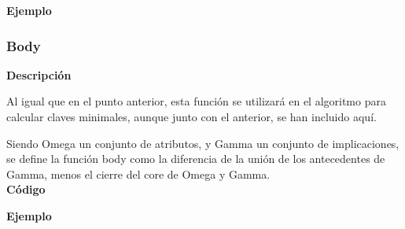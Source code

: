     \textbf{Ejemplo}




\subsubsection{Body}

    \textbf{Descripci\'on}

    Al igual que en el punto anterior, esta funci\'on se utilizar\'a en el algoritmo para calcular claves minimales, aunque junto con 
    el anterior, se han incluido aqu\'i.

    Siendo Omega un conjunto de atributos, y Gamma un conjunto de implicaciones, se define la funci\'on body como la diferencia 
    de la uni\'on de los antecedentes de Gamma, menos el cierre del core de Omega y Gamma. 
    \\


    \textbf{C\'odigo}

    

    \textbf{Ejemplo}


